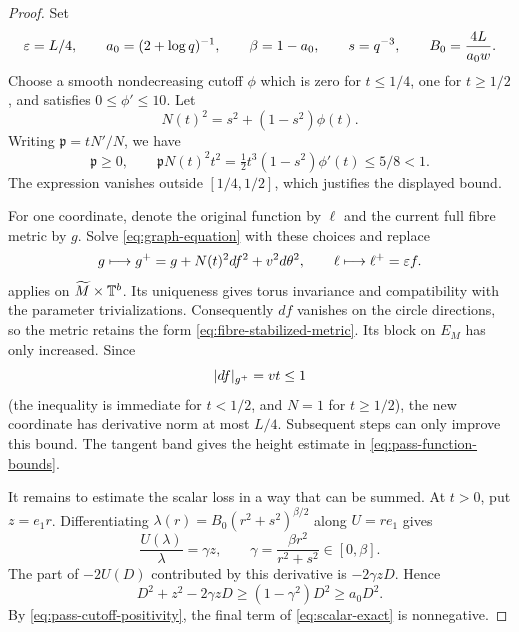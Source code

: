 \begin{proof}
Set
\begin{equation}\label{eq:pass-parameters}
 \varepsilon=L/4,\qquad a_0=(2+\log q)^{-1},\qquad
 \beta=1-a_0,\qquad s=q^{-3},\qquad B_0=\frac{4L}{a_0w}.
\end{equation}
Choose a smooth nondecreasing cutoff $\phi$ which is zero for $t\le1/4$, one for $t\ge1/2$, and satisfies $0\le\phi'\le10$. Let
\begin{equation}\label{eq:pass-cutoff}
 N(t)^2=s^2+(1-s^2)\phi(t).
\end{equation}
Writing $\mathfrak p=tN'/N$, we have
\begin{equation}\label{eq:pass-cutoff-positivity}
 \mathfrak p\ge0,\qquad
 \mathfrak p N(t)^2t^2
       =\tfrac12 t^3(1-s^2)\phi'(t)\le5/8<1.
\end{equation}
The expression vanishes outside $[1/4,1/2]$, which justifies the displayed bound.

For one coordinate, denote the original function by $\ell$ and the current full fibre metric by $g$. Solve \eqref{eq:graph-equation} with these choices and replace
\[
 g\longmapsto g^+=g+N(t)^2df^2+v^2d\theta^2,
 \qquad \ell\longmapsto\ell^+=\varepsilon f.
\]
 applies on $\widetilde M\times\mathbb T^b$. Its
uniqueness gives torus invariance and compatibility with the parameter
trivializations. Consequently $df$ vanishes on the circle directions, so
the metric retains the form \eqref{eq:fibre-stabilized-metric}. Its block
on $E_M$ has only increased. Since
\[
 \lvert df\rvert_{g^+}=vt\le1
\]
(the inequality is immediate for $t<1/2$, and $N=1$ for $t\ge1/2$), the new coordinate has derivative norm at most $L/4$. Subsequent steps can only improve this bound. The tangent band gives the height estimate in \eqref{eq:pass-function-bounds}.

It remains to estimate the scalar loss in a way that can be summed. At $t>0$, put $z=e_1r$. Differentiating $\lambda(r)=B_0(r^2+s^2)^{\beta/2}$ along $U=re_1$ gives
\[
 \frac{U(\lambda)}{\lambda}=\gamma z,
 \qquad \gamma=\frac{\beta r^2}{r^2+s^2}\in[0,\beta].
\]
The part of $-2U(D)$ contributed by this derivative is $-2\gamma zD$. Hence
\begin{equation}\label{eq:pass-square-absorption}
 D^2+z^2-2\gamma zD
       \ge(1-\gamma^2)D^2\ge a_0D^2.
\end{equation}
By \eqref{eq:pass-cutoff-positivity}, the final term of \eqref{eq:scalar-exact} is nonnegative.


\end{proof}
